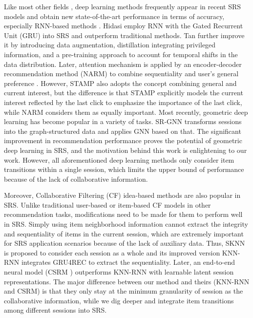 \documentclass[conference]{IEEEtran}
\begin{document}
Like most other fields \cite{li2019fi, zhang2020every, hu2019graphair, zhu2020deep, chen2020jit2r}, deep learning methods \cite{yu2020tagnn, mi2020ader, liu2020long, wang2019modeling, wang2019survey, wang2020graph, wang2020intention, wang2020intention2basket, wu2019personalizing, chen2018sequential, ye2020time} frequently appear in recent SRS models and obtain new state-of-the-art performance in terms of accuracy, especially RNN-based methods \cite{hidasi2015session,tan2016improved,li2017neural,liu2018stamp}. Hidasi  \cite{hidasi2015session} employ RNN with the Gated Recurrent Unit (GRU) into SRS and outperform traditional methods. Tan  \cite{tan2016improved} further improve it by introducing data augmentation, distillation integrating privileged information, and a pre-training approach to account for temporal shifts in the data distribution. Later, attention mechanism is applied by an encoder-decoder recommendation method (NARM) to combine sequentiality and user's general preference \cite{li2017neural}. However, STAMP \cite{liu2018stamp} also adopts the concept combining general and current interest, but the difference is that STAMP explicitly models the current interest reflected by the last click to emphasize the importance of the last click, while NARM considers them as equally important. Most recently, geometric deep learning has become popular in a variety of tasks. SR-GNN \cite{wu2019srgnn} transforms sessions into the graph-structured data and applies GNN based on that. The significant improvement in recommendation performance proves the potential of geometric deep learning in SRS, and the motivation behind this work is enlightening to our work. However, all aforementioned deep learning methods only consider item transitions within a single session, which limits the upper bound of performance because of the lack of collaborative information.

Moreover, Collaborative Filtering (CF) idea-based methods are also popular in SRS. Unlike traditional user-based \cite{Jin04} or item-based \cite{Linden03,Billsus98,Pareek13,Sarwar00} CF models in other recommendation tasks, modifications need to be made for them to perform well in SRS. Simply using item neighborhood information \cite{sarwar2001item} cannot extract the integrity and sequentiality of items in the current session, which are extremely important for SRS application scenarios because of the lack of auxiliary data. Thus, SKNN \cite{bonnin2014sknn} is proposed to consider each session as a whole and its improved version KNN-RNN \cite{jannach2017recurrent} integrates GRU4REC to extract the sequentiality. Later, an end-to-end neural model (CSRM \cite{wang2019CSRM}) outperforms KNN-RNN with learnable latent session representations. The major difference between our method and theirs (KNN-RNN and CSRM) is that they only stay at the minimum granularity of session as the collaborative information, while we dig deeper and integrate item transitions among different sessions into SRS.
\end{document}
